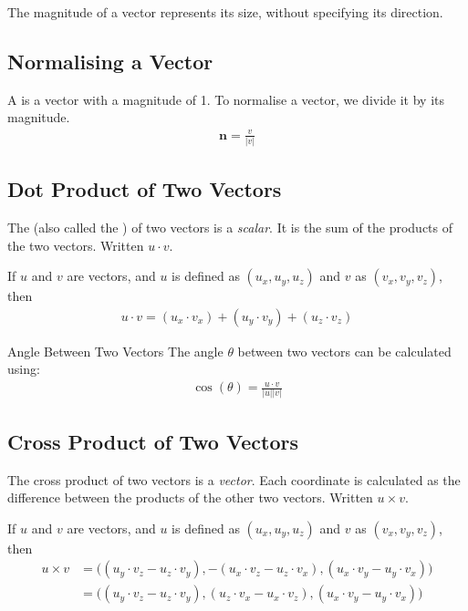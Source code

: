 \documentclass[../COS3712_Notes.tex]{subfiles}
\begin{document}
        The magnitude of a vector represents its size, without specifying its direction.

      \subsection{Normalising a Vector}
        A  is a vector with a magnitude of 1.
        To normalise a vector, we divide it by its magnitude.
        \begin{align*}
          \mathbf{n} = \frac{v}{\lvert v \rvert}
        \end{align*}

      \subsection{Dot Product of Two Vectors}
        The  (also called the ) of two vectors
        is a \emph{scalar}.
        It is the sum of the products of the two vectors.
        Written $u \cdot v$.

        If $u$ and $v$ are vectors, and $u$ is defined as $(u_x, u_y, u_z)$ and $v$ as $(v_x, v_y, v_z)$,
        then
        \begin{align*}
          u \cdot v = (u_x \cdot v_x) + (u_y \cdot v_y) + (u_z \cdot v_z)
        \end{align*}

        \begin{sidenote}{Angle Between Two Vectors}
          The angle $\theta$ between two vectors can be calculated using:
          \begin{align*}
            \cos(\theta) = \frac{u \cdot v}{\lvert u \rvert \lvert v \rvert}
          \end{align*}
        \end{sidenote}

      \pagebreak

      \subsection{Cross Product of Two Vectors}
        The cross product of two vectors is a \emph{vector}.
        Each coordinate is calculated as the difference between the products of the
        other two vectors.
        Written $u \times v$.

        If $u$ and $v$ are vectors, and $u$ is defined as $(u_x, u_y, u_z)$ and $v$ as $(v_x, v_y, v_z)$,
        then
        \begin{align*}
          u \times v &= \bigl((u_y \cdot v_z - u_z \cdot v_y), - (u_x \cdot v_z - u_z \cdot v_x), (u_x \cdot v_y - u_y \cdot v_x)\bigr)\\
                     &= \bigl((u_y \cdot v_z - u_z \cdot v_y), (u_z \cdot v_x - u_x \cdot v_z), (u_x \cdot v_y - u_y \cdot v_x)\bigr)
        \end{align*}
\end{document}
